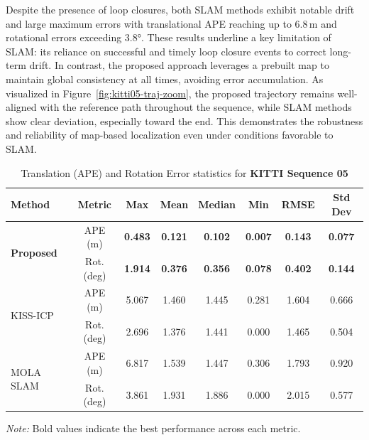 Despite the presence of loop closures, both SLAM methods exhibit notable drift and large maximum errors with translational APE reaching up to 6.8\,m and rotational errors exceeding {3.8°}. These results underline a key limitation of SLAM: its reliance on successful and timely loop closure events to correct long-term drift. In contrast, the proposed approach leverages a prebuilt map to maintain global consistency at all times, avoiding error accumulation. As visualized in Figure~\ref{fig:kitti05-traj-zoom}, the proposed trajectory remains well-aligned with the reference path throughout the sequence, while SLAM methods show clear deviation, especially toward the end. This demonstrates the robustness and reliability of map-based localization  even under conditions favorable to SLAM.

\begin{table}[H]
	\centering
	\renewcommand{\arraystretch}{0.6}
	\setlength{\tabcolsep}{15pt}
	\caption{Translation (APE) and Rotation Error statistics for \textbf{KITTI Sequence 05}}
	\label{tab:ape_rot_kitti_seq5}
	
	\begin{adjustbox}{width=\textwidth}
		\begin{tabular}{@{}lccccccc@{}}
			\toprule
			\textbf{Method} & \textbf{Metric} & \textbf{Max} & \textbf{Mean} & \textbf{Median} & \textbf{Min} & \textbf{RMSE} & \textbf{Std Dev} \\
			\midrule
			
			\multirow{2}{*}{\textbf{Proposed}} 
			& APE (m)        & \textbf{0.483}   & \textbf{0.121}   & \textbf{0.102}     & \textbf{0.007}   & \textbf{0.143}   & \textbf{0.077} \\
			& Rot. (deg)     & \textbf{1.914}   & \textbf{0.376}   & \textbf{0.356}     & \textbf{0.078}   & \textbf{0.402}   & \textbf{0.144} \\
			\midrule
			
			\multirow{2}{*}{KISS-ICP} 
			& APE (m)        & 5.067   & 1.460   & 1.445     & 0.281    & 1.604   & 0.666 \\
			& Rot. (deg)     & 2.696   & 1.376   & 1.441     & 0.000    & 1.465   & 0.504 \\
			\midrule
			
			\multirow{2}{*}{MOLA SLAM} 
			& APE (m)        & 6.817   & 1.539   & 1.447     & 0.306    & 1.793   & 0.920 \\
			& Rot. (deg)     & 3.861   & 1.931   & 1.886     & 0.000    & 2.015   & 0.577 \\
			\bottomrule
		\end{tabular}
	\end{adjustbox}

{\footnotesize \textit{Note:} Bold values indicate the best performance across each metric.}
\end{table}


